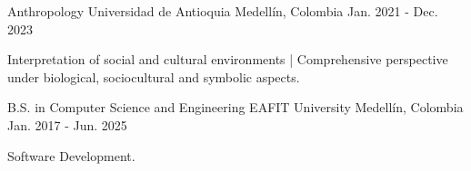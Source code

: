 

\begin{cventries}

  \cventry
    {Anthropology} %
    {Universidad de Antioquia} %
    {Medellín, Colombia} %
    {Jan. 2021 - Dec. 2023} %
    {
      \begin{cvitems} %
        \item {Interpretation of social and cultural environments | Comprehensive perspective under biological, sociocultural and symbolic aspects.}
      \end{cvitems}
    }
  \cventry
    {B.S. in Computer Science and Engineering} %
    {EAFIT University} %
    {Medellín, Colombia} %
    {Jan. 2017 - Jun. 2025} %
    {
      \begin{cvitems} %
        \item {Software Development.}
      \end{cvitems}
    }
\end{cventries}